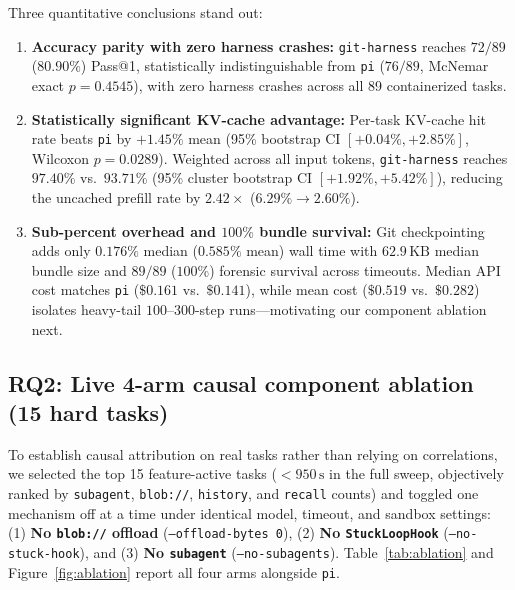 \documentclass[11pt]{article}
\begin{document}
Three quantitative conclusions stand out:
\begin{enumerate}[leftmargin=*,nosep]
  \item \textbf{Accuracy parity with zero harness crashes:} \texttt{git-harness} reaches $72/89$ ($80.90\%$) Pass@1, statistically indistinguishable from \texttt{pi} ($76/89$, McNemar exact $p = 0.4545$), with zero harness crashes across all 89 containerized tasks.
  \item \textbf{Statistically significant KV-cache advantage:} Per-task KV-cache hit rate beats \texttt{pi} by $+1.45\%$ mean (95\% bootstrap CI $[+0.04\%, +2.85\%]$, Wilcoxon $p = 0.0289$). Weighted across all input tokens, \texttt{git-harness} reaches $97.40\%$ vs.\ $93.71\%$ (95\% cluster bootstrap CI $[+1.92\%, +5.42\%]$), reducing the uncached prefill rate by \textbf{$2.42\times$} ($6.29\% \to 2.60\%$).
  \item \textbf{Sub-percent overhead and $100\%$ bundle survival:} Git checkpointing adds only $0.176\%$ median ($0.585\%$ mean) wall time with $62.9\,\mathrm{KB}$ median bundle size and $89/89$ ($100\%$) forensic survival across timeouts. Median API cost matches \texttt{pi} ($\$0.161$ vs.\ $\$0.141$), while mean cost ($\$0.519$ vs.\ $\$0.282$) isolates heavy-tail $100\text{--}300$-step runs---motivating our component ablation next.
\end{enumerate}

\subsection{RQ2: Live 4-arm causal component ablation (15 hard tasks)}
\label{sec:rq2}
To establish causal attribution on real tasks rather than relying on correlations, we selected the top 15 feature-active tasks ($<950\,\mathrm{s}$ in the full sweep, objectively ranked by \texttt{subagent}, \texttt{blob://}, \texttt{history}, and \texttt{recall} counts) and toggled one mechanism off at a time under identical model, timeout, and sandbox settings: (1) \textbf{No \texttt{blob://} offload} (\texttt{--offload-bytes 0}), (2) \textbf{No \texttt{StuckLoopHook}} (\texttt{--no-stuck-hook}), and (3) \textbf{No \texttt{subagent}} (\texttt{--no-subagents}). Table~\ref{tab:ablation} and Figure~\ref{fig:ablation} report all four arms alongside \texttt{pi}.
\end{document}
